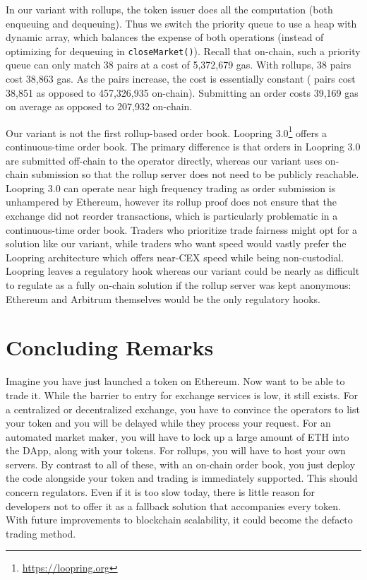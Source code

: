 In our \cm variant with rollups, the token issuer does all the computation (both enqueuing and dequeuing). Thus we switch the priority queue to use a heap with dynamic array, which balances the expense of both operations (instead of optimizing for dequeuing in \texttt{closeMarket()}). Recall that on-chain, such a priority queue can only match 38 pairs at a cost of 5,372,679 gas. With rollups, 38 pairs cost 38,863 gas. As the pairs increase, the cost is essentially constant ( pairs cost 38,851 as opposed to 457,326,935 on-chain). Submitting an order costs 39,169 gas on average as opposed to 207,932 on-chain.

Our \cm variant is not the first rollup-based order book. Loopring 3.0\footnote{\url{https://loopring.org}} offers a continuous-time order book. The primary difference is that orders in Loopring 3.0 are submitted off-chain to the operator directly, whereas our variant uses on-chain submission so that the rollup server does not need to be publicly reachable. Loopring 3.0 can operate near high frequency trading as order submission is unhampered by Ethereum, however its  rollup proof does not ensure that the exchange did not reorder transactions, which is particularly problematic in a continuous-time order book. Traders who prioritize trade fairness might opt for a solution like our variant, while traders who want speed would vastly prefer the Loopring architecture which offers near-CEX speed while being non-custodial. Loopring leaves a regulatory hook whereas our variant could be nearly as difficult to regulate as a fully on-chain solution if the rollup server was kept anonymous: Ethereum and Arbitrum themselves would be the only regulatory hooks. 



\section{Concluding Remarks} 

Imagine you have just launched a token on Ethereum. Now want to be able to trade it. While the barrier to entry for exchange services is low, it still exists. For a centralized or decentralized exchange, you have to convince the operators to list your token and you will be delayed while they process your request. For an automated market maker, you will have to lock up a large amount of ETH into the DApp, along with your tokens. For rollups, you will have to host your own servers. By contrast to all of these, with an on-chain order book, you just deploy the code alongside your token and trading is immediately supported. This should concern regulators. Even if it is too slow today, there is little reason for developers not to offer it as a fallback solution that accompanies every token. With future improvements to blockchain scalability, it could become the defacto trading method. 

